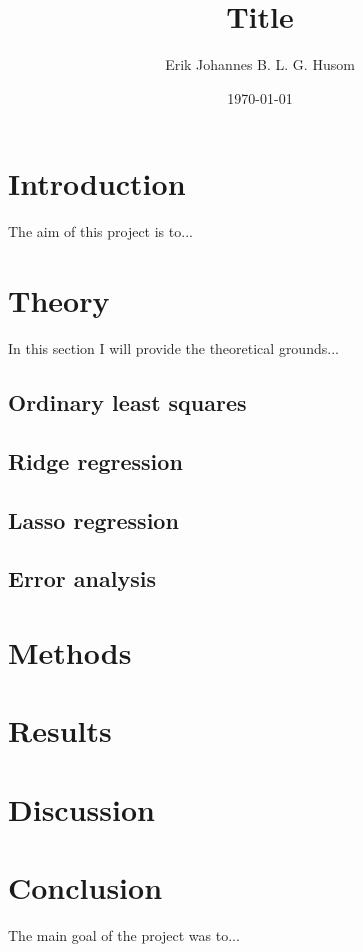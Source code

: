 \documentclass[10pt, a4paper]{article}
\title{Title}
\author{Erik Johannes B. L. G. Husom}
\date{\today}
\numberwithin{figure}{section}
\numberwithin{table}{section}
\begin{document}
\maketitle

\begin{abstract}

\end{abstract}


\tableofcontents

\section{Introduction}
The aim of this project is to...


\section{Theory}
    In this section I will provide the theoretical grounds...

\subsection{Ordinary least squares}

\subsection{Ridge regression}


\subsection{Lasso regression}


\subsection{Error analysis}



\section{Methods}

\section{Results}

\section{Discussion}

\section{Conclusion}
The main goal of the project was to...

%


\end{document}
